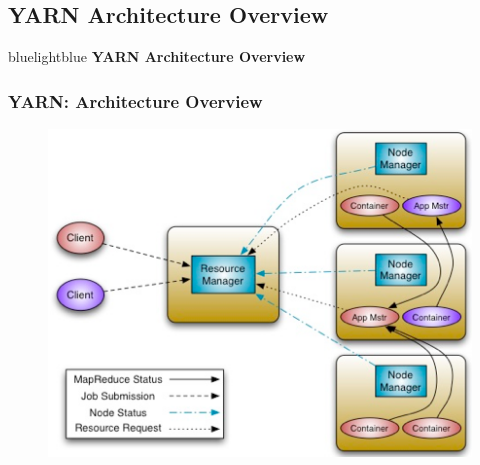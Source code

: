 \subsection{YARN Architecture Overview}
\begin{frame}
 \begin{colorblock}{blue}{lightblue}{ }
    \Large \textbf{YARN Architecture Overview}
  \end{colorblock}
\end{frame}

\begin{frame}
\frametitle{YARN: Architecture Overview}
\begin{figure}[h]
  \centering
  \includegraphics[scale=0.5]{./figures/yarn_arch}
  \label{fig:yarn_arch}
\end{figure}
\end{frame}

